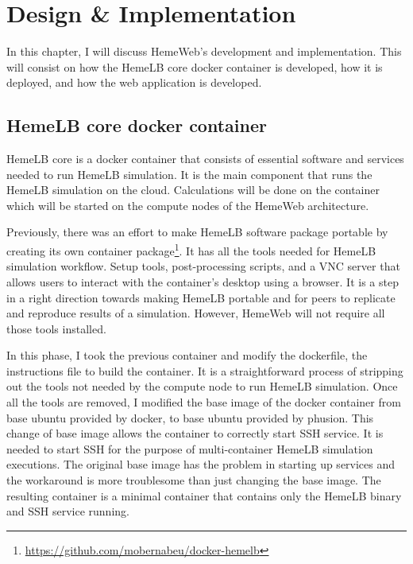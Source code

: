  

\chapter[Design \& Implementation]{Design \& Implementation}

In this chapter, I will discuss HemeWeb's development and implementation. This will consist on how the HemeLB core docker container is developed, how it is deployed, and how the web application is developed.


\section{HemeLB core docker container}

HemeLB core is a docker container that consists of essential software and services needed to run HemeLB simulation. It is the main component that runs the HemeLB simulation on the cloud. Calculations will be done on the container which will be started on the compute nodes of the HemeWeb architecture. 

Previously, there was an effort to make HemeLB software package portable by creating its own container package\footnote{\url{https://github.com/mobernabeu/docker-hemelb}}. It has all the tools needed for HemeLB simulation workflow. Setup tools, post-processing scripts, and a VNC server that allows users to interact with the container's desktop using a browser. It is a step in a right direction towards making HemeLB portable and for peers to replicate and reproduce results of a simulation. However, HemeWeb will not require all those tools installed.

In this phase, I took the previous container and modify the dockerfile, the instructions file to build the container. It is a straightforward process of stripping out the tools not needed by the compute node to run HemeLB simulation. Once all the tools are removed, I modified the base image of the docker container from base ubuntu provided by docker, to base ubuntu provided by phusion. This change of base image allows the container to correctly start SSH service. It is needed to start SSH for the purpose of multi-container HemeLB simulation executions. The original base image has the problem in starting up services and the workaround is more troublesome than just changing the base image. The resulting container is a minimal container that contains only the HemeLB binary and SSH service running.

